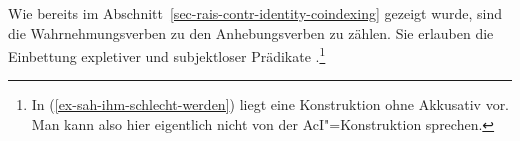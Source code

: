 Wie bereits im Abschnitt~\ref{sec-rais-contr-identity-coindexing} gezeigt wurde,
sind die Wahrnehmungsverben zu den Anhebungsverben zu zählen.
Sie erlauben die Einbettung expletiver und subjektloser Prädikate \parencites[]{Reis76c}[]{Hoehle78a}.\footnote{
  In (\ref{ex-sah-ihm-schlecht-werden}) liegt eine Konstruktion ohne Akkusativ vor.
  Man kann also hier eigentlich nicht von der AcI"=Konstruktion sprechen.%
}
\eal
{}
